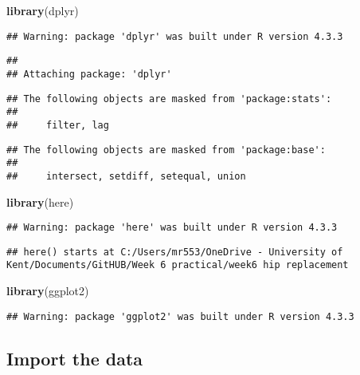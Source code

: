 \documentclass[
]{article}
\newenvironment{Shaded}{\begin{snugshade}}{\end{snugshade}}
\newcommand{\FunctionTok}[1]{\textcolor[rgb]{0.13,0.29,0.53}{\textbf{#1}}}
\newcommand{\NormalTok}[1]{#1}
\begin{document}
\begin{Shaded}
\begin{Highlighting}[]
\FunctionTok{library}\NormalTok{(dplyr)}
\end{Highlighting}
\end{Shaded}

\begin{verbatim}
## Warning: package 'dplyr' was built under R version 4.3.3
\end{verbatim}

\begin{verbatim}
## 
## Attaching package: 'dplyr'
\end{verbatim}

\begin{verbatim}
## The following objects are masked from 'package:stats':
## 
##     filter, lag
\end{verbatim}

\begin{verbatim}
## The following objects are masked from 'package:base':
## 
##     intersect, setdiff, setequal, union
\end{verbatim}

\begin{Shaded}
\begin{Highlighting}[]
\FunctionTok{library}\NormalTok{(here)}
\end{Highlighting}
\end{Shaded}

\begin{verbatim}
## Warning: package 'here' was built under R version 4.3.3
\end{verbatim}

\begin{verbatim}
## here() starts at C:/Users/mr553/OneDrive - University of Kent/Documents/GitHUB/Week 6 practical/week6 hip replacement
\end{verbatim}

\begin{Shaded}
\begin{Highlighting}[]
\FunctionTok{library}\NormalTok{(ggplot2)}
\end{Highlighting}
\end{Shaded}

\begin{verbatim}
## Warning: package 'ggplot2' was built under R version 4.3.3
\end{verbatim}

\subsection{Import the data}\label{import-the-data}
\end{document}
